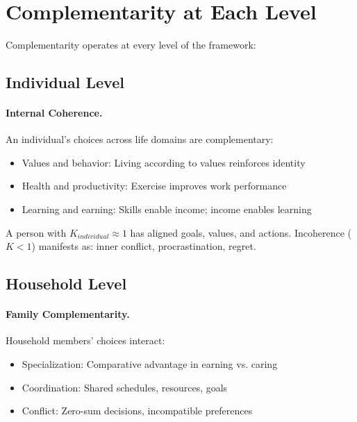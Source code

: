 
\section{Complementarity at Each Level}
\label{sec:comp-levels}


Complementarity operates at every level of the framework:

\subsection{Individual Level}
\label{sec:comp-individual}

\paragraph{Internal Coherence.}
An individual's choices across life domains are complementary:
\begin{itemize}[nosep]
  \item Values and behavior: Living according to values reinforces identity
  \item Health and productivity: Exercise improves work performance
  \item Learning and earning: Skills enable income; income enables learning
\end{itemize}

A person with $K_{individual} \approx 1$ has aligned goals, values, and actions.
Incoherence ($K < 1$) manifests as: inner conflict, procrastination, regret.

\subsection{Household Level}
\label{sec:comp-household}

\paragraph{Family Complementarity.}
Household members' choices interact:
\begin{itemize}[nosep]
  \item Specialization: Comparative advantage in earning vs. caring
  \item Coordination: Shared schedules, resources, goals
  \item Conflict: Zero-sum decisions, incompatible preferences
\end{itemize}

